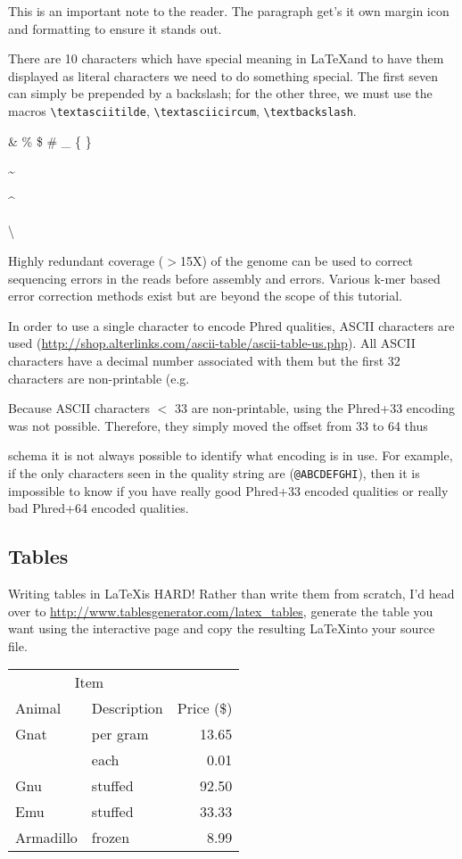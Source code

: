 \begin{note}
This is an important note to the reader. The paragraph get's it own margin icon and formatting to
ensure it stands out.
\end{note}

There are 10 characters which have special meaning in \LaTeX and to have them displayed as literal
characters we need to do something special. The first seven can simply be prepended by a backslash;
for the other three, we must use the macros \verb+\textasciitilde+, \verb+\textasciicircum+,
\verb+\textbackslash+.


\& \% \$ \# \_ \{ \}

\textasciitilde

\textasciicircum

\textbackslash

Highly redundant coverage ($>$15X) of the genome can be used to correct sequencing
errors in the reads before assembly and errors. Various k-mer based error
correction methods exist but are beyond the scope of this tutorial.

In order to use a single character to encode Phred qualities, ASCII characters
are used (\url{http://shop.alterlinks.com/ascii-table/ascii-table-us.php}). All ASCII characters have a decimal
number associated with them but the first 32 characters are non-printable (e.g.

Because ASCII characters $<$ 33 are non-printable, using the Phred+33 encoding was
not possible. Therefore, they simply moved the offset from 33 to 64 thus

schema it is not always possible to identify what encoding is in use. For
example, if the only characters seen in the quality string are (\texttt{@ABCDEFGHI}),
then it is impossible to know if you have really good Phred+33 encoded qualities
or really bad Phred+64 encoded qualities.

\subsection{Tables}

Writing tables in \LaTeX is HARD! Rather than write them from scratch, I'd head over to
\url{http://www.tablesgenerator.com/latex_tables}, generate the table you want using the interactive
page and copy the resulting \LaTeX into your source file.

\begin{tabular}{llr}
\hline
\multicolumn{2}{c}{Item} \\
\cline{1-2}
Animal    & Description & Price (\$) \\
\hline
Gnat      & per gram    & 13.65      \\
          & each        & 0.01       \\
Gnu       & stuffed     & 92.50      \\
Emu       & stuffed     & 33.33      \\
Armadillo & frozen      & 8.99       \\
\hline
\end{tabular}

